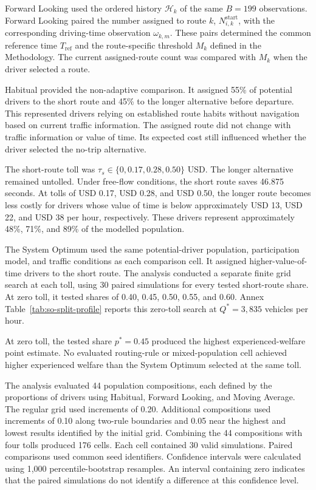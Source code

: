 \documentclass{article}
\begin{document}
Forward Looking used the ordered history $\mathcal H_k$ of the same $B=199$ observations. Forward Looking paired the number assigned to route $k$, $N_{i,k}^{\mathrm{start}}$, with the corresponding driving-time observation $\omega_{k,m}$. These pairs determined the common reference time $T_{\mathrm{ref}}$ and the route-specific threshold $M_k$ defined in the Methodology. The current assigned-route count was compared with $M_k$ when the driver selected a route.

Habitual provided the non-adaptive comparison. It assigned 55\% of potential drivers to the short route and 45\% to the longer alternative before departure. This represented drivers relying on established route habits without navigation based on current traffic information. The assigned route did not change with traffic information or value of time. Its expected cost still influenced whether the driver selected the no-trip alternative.

The short-route toll was $\tau_s\in\{0,0.17,0.28,0.50\}$ USD. The longer alternative remained untolled. Under free-flow conditions, the short route saves 46.875 seconds. At tolls of USD 0.17, USD 0.28, and USD 0.50, the longer route becomes less costly for drivers whose value of time is below approximately USD 13, USD 22, and USD 38 per hour, respectively. These drivers represent approximately 48\%, 71\%, and 89\% of the modelled population.

The System Optimum used the same potential-driver population, participation model, and traffic conditions as each comparison cell. It assigned higher-value-of-time drivers to the short route. The analysis conducted a separate finite grid search at each toll, using 30 paired simulations for every tested short-route share. At zero toll, it tested shares of 0.40, 0.45, 0.50, 0.55, and 0.60. Annex Table~\ref{tab:so-split-profile} reports this zero-toll search at $Q^*=3{,}835$ vehicles per hour.

At zero toll, the tested share $p^*=0.45$ produced the highest experienced-welfare point estimate. No evaluated routing-rule or mixed-population cell achieved higher experienced welfare than the System Optimum selected at the same toll.

The analysis evaluated 44 population compositions, each defined by the proportions of drivers using Habitual, Forward Looking, and Moving Average. The regular grid used increments of 0.20. Additional compositions used increments of 0.10 along two-rule boundaries and 0.05 near the highest and lowest results identified by the initial grid. Combining the 44 compositions with four tolls produced 176 cells. Each cell contained 30 valid simulations. Paired comparisons used common seed identifiers. Confidence intervals were calculated using 1,000 percentile-bootstrap resamples. An interval containing zero indicates that the paired simulations do not identify a difference at this confidence level.
\end{document}
